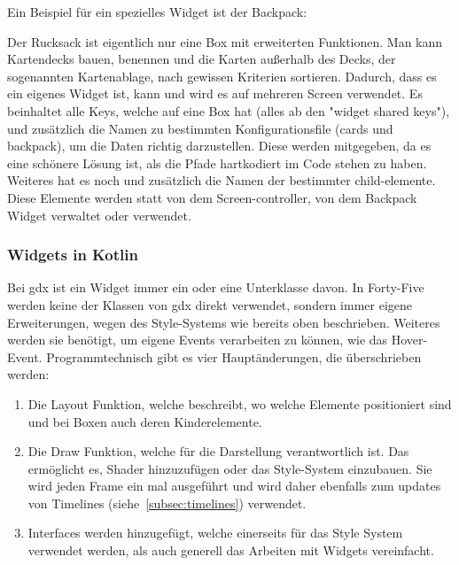 Ein Beispiel für ein spezielles Widget ist der Backpack:
Der Rucksack ist eigentlich nur eine Box mit erweiterten Funktionen.
Man kann Kartendecks bauen, benennen und die Karten außerhalb des Decks, der sogenannten Kartenablage, nach gewissen Kriterien sortieren.
Dadurch, dass es ein eigenes Widget ist, kann und wird es auf mehreren Screen verwendet.
Es beinhaltet alle Keys, welche auf eine Box hat (alles ab den "widget shared keys"), und zusätzlich die Namen zu bestimmten Konfigurationsfile (cards und backpack), um die Daten richtig darzustellen.
Diese werden mitgegeben, da es eine schönere Lösung ist, als die Pfade hartkodiert im Code stehen zu haben.
Weiteres hat es noch und zusätzlich die Namen der bestimmter child-elemente.
Diese Elemente werden statt von dem Screen-controller, von dem Backpack Widget verwaltet oder verwendet.
\renewcommand{\kapitelautor}{Autor: Felix Zwickelstorfer}
\subsubsection{Widgets in Kotlin}\label{subsubsec:widgetsinkotlin}
\renewcommand{\kapitelautor}{Autor: Felix Zwickelstorfer}
Bei gdx ist ein Widget immer ein  oder eine Unterklasse davon.
In Forty-Five werden keine der Klassen von gdx direkt verwendet, sondern immer eigene Erweiterungen, wegen des Style-Systems wie bereits oben beschrieben.
Weiteres werden sie benötigt, um eigene Events verarbeiten zu können, wie das Hover-Event.
Programmtechnisch gibt es vier Hauptänderungen, die überschrieben werden:
\begin{enumerate}
    \item Die Layout Funktion, welche beschreibt, wo welche Elemente positioniert sind und bei Boxen auch deren Kinderelemente.
    \item Die Draw Funktion, welche für die Darstellung verantwortlich ist. Das ermöglicht es, Shader hinzuzufügen oder das Style-System einzubauen.
        Sie wird jeden Frame ein mal ausgeführt und wird daher ebenfalls zum updates von Timelines (siehe~\ref{subsec:timelines}) verwendet.
    \item Interfaces werden hinzugefügt, welche einerseits für das Style System verwendet werden, als auch generell das Arbeiten mit Widgets vereinfacht.
\end{enumerate}
\renewcommand{\kapitelautor}{Autor: Felix Zwickelstorfer}
